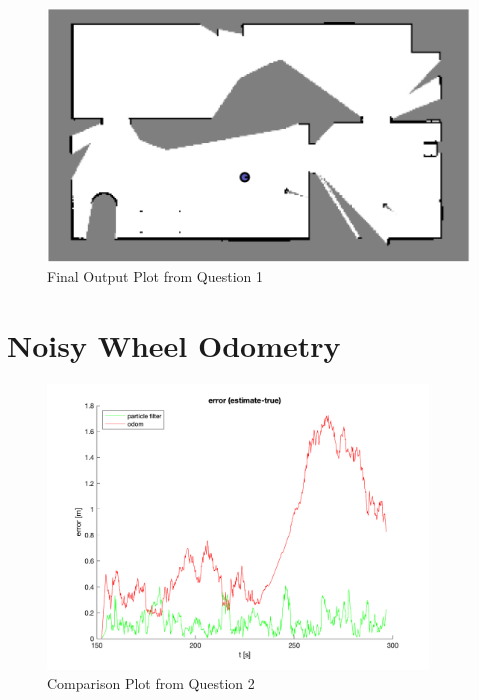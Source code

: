 \documentclass{article} %
\begin{document}
\begin{figure}[hbt]
  \centering
    \includegraphics[width=1.0\textwidth]{ass2_q1.png}
  \caption{Final Output Plot from Question 1}
  \label{fig:q1}
\end{figure}



\section{Noisy Wheel Odometry}
\begin{figure}[hbt]
  \centering
    \includegraphics[width=0.9\textwidth]{ass2_q2.png}
  \caption{Comparison Plot from Question 2}
\end{figure}
\end{document}
